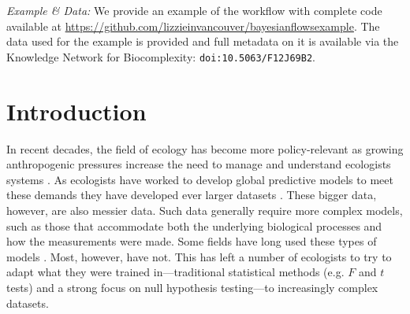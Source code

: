 \documentclass[11pt]{article}
\begin{document}
\vspace{3ex}
\noindent\emph{Example \& Data:} We provide an example of the workflow with complete code available at \url{https://github.com/lizzieinvancouver/bayesianflowsexample}.  The data used for the example is provided and full metadata on it is available via the Knowledge Network for Biocomplexity: \verb|doi:10.5063/F12J69B2|. 



\setlength{\parindent}{0pt}
\setlength{\parskip}{7pt}

\newpage

\section*{Introduction}
In recent decades, the field of ecology has become more policy-relevant as growing anthropogenic pressures increase the need to manage and understand ecologists systems  \citep{hak2016sustainable,lindenmayer2010science}. As ecologists have worked to develop global predictive models to meet these demands they have developed ever larger datasets \citep{Hampton2013}. These bigger data, however, are also messier data. Such data generally require more complex models, such as those that accommodate both the underlying biological processes and how the measurements were made. Some fields have long used these types of models \citep[generally in fields focused on inferring population sizes for management,][]{muthuku2008,zheng2007,trijoulet2018,strinella2020potential}. Most, however, have not. This has left a number of ecologists to try to adapt what they were trained in---traditional statistical methods (e.g. $F$ and $t$ tests) and a strong focus on null hypothesis testing---to increasingly complex datasets. 
\end{document}
